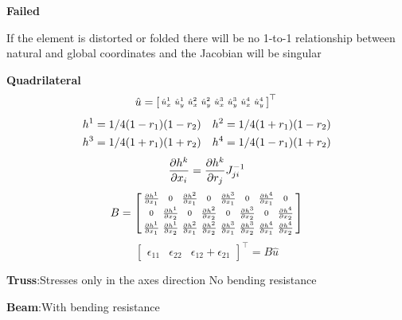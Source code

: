 \documentclass[landscape,a0paper,fontscale=0.285]{baposter} %
\begin{document}
\begin{poster}
{\textbf{Failed}

If the element is distorted or folded
there will be no 1-to-1 relationship
between natural and global
coordinates and the Jacobian will be singular

\textbf{Quadrilateral}
\vspace{-0.3cm}
$$\vspace{-0.3cm}
\hat u = \left[\begin{smallmatrix}
\hat u_x^1 & \hat u_y^1 & \hat u_x^2 & \hat u_y^2  &
\hat u_x^3 & \hat u_y^3 & \hat u_x^4 & \hat u_y^4
\end{smallmatrix}\right]^\top\\
$$
$$\vspace{-0.3cm}
\begin{aligned}
h^1 = 1/4(1-r_1)(1-r_2) \quad
h^2 = 1/4(1+r_1)(1-r_2) \\
h^3 = 1/4(1+r_1)(1+r_2) \quad 
h^4 = 1/4(1-r_1)(1+r_2)
\end{aligned}
$$
$$\vspace{-0.3cm}
\frac{\partial h^k}{\partial x_i} = \frac{\partial h^k}{\partial r_j} J^{-1}_{ji}
$$
$$\vspace{-0.3cm}
B = \left[\begin{smallmatrix}
\frac{\partial h^1}{\partial x_1} & 0 &
\frac{\partial h^2}{\partial x_1} & 0 &
\frac{\partial h^3}{\partial x_1} & 0 &
\frac{\partial h^4}{\partial x_1} & 0 \\
0 & \frac{\partial h^1}{\partial x_2} & 
0 & \frac{\partial h^2}{\partial x_2} & 
0 & \frac{\partial h^3}{\partial x_2} & 
0 & \frac{\partial h^4}{\partial x_2} \\
\frac{\partial h^1}{\partial x_1} & 
\frac{\partial h^1}{\partial x_2} & 
\frac{\partial h^2}{\partial x_1} &
\frac{\partial h^2}{\partial x_2} & 
\frac{\partial h^3}{\partial x_1} & 
\frac{\partial h^3}{\partial x_2} &
\frac{\partial h^4}{\partial x_1} & 
\frac{\partial h^4}{\partial x_2}
\end{smallmatrix}\right]
$$
$$
\left[\begin{smallmatrix}
    \epsilon_{11} & \epsilon_{22} & \epsilon_{12} + \epsilon_{21}
\end{smallmatrix}\right]^\top = B \hat u
$$

\colorbox[HTML]{CCFFFF}{}

\textbf{Truss}:Stresses only in the axes direction
No bending resistance

\textbf{Beam}:With bending resistance

}
\end{poster}
\end{document}
